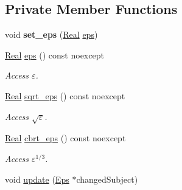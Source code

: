 \subsection*{Private Member Functions}
\begin{DoxyCompactItemize}
\item 
\hypertarget{classSpacy_1_1Mixin_1_1Eps_a818ab6dfab5e4eea583e1302bcc621f8}{void {\bfseries set\-\_\-eps} (\hyperlink{classSpacy_1_1Real}{Real} \hyperlink{classSpacy_1_1Mixin_1_1Eps_a812b99b0abc1d78a34b4114907f23f52}{eps})}\label{classSpacy_1_1Mixin_1_1Eps_a818ab6dfab5e4eea583e1302bcc621f8}

\item 
\hypertarget{classSpacy_1_1Mixin_1_1Eps_a812b99b0abc1d78a34b4114907f23f52}{\hyperlink{classSpacy_1_1Real}{Real} \hyperlink{classSpacy_1_1Mixin_1_1Eps_a812b99b0abc1d78a34b4114907f23f52}{eps} () const noexcept}\label{classSpacy_1_1Mixin_1_1Eps_a812b99b0abc1d78a34b4114907f23f52}

\begin{DoxyCompactList}\small\item\em Access $\varepsilon$. \end{DoxyCompactList}\item 
\hypertarget{classSpacy_1_1Mixin_1_1Eps_a1c1b0ed7f14ed4967dc7da9295a136d4}{\hyperlink{classSpacy_1_1Real}{Real} \hyperlink{classSpacy_1_1Mixin_1_1Eps_a1c1b0ed7f14ed4967dc7da9295a136d4}{sqrt\-\_\-eps} () const noexcept}\label{classSpacy_1_1Mixin_1_1Eps_a1c1b0ed7f14ed4967dc7da9295a136d4}

\begin{DoxyCompactList}\small\item\em Access $\sqrt\varepsilon$. \end{DoxyCompactList}\item 
\hypertarget{classSpacy_1_1Mixin_1_1Eps_a91dbe45e297be2bc53f1a96107a58c64}{\hyperlink{classSpacy_1_1Real}{Real} \hyperlink{classSpacy_1_1Mixin_1_1Eps_a91dbe45e297be2bc53f1a96107a58c64}{cbrt\-\_\-eps} () const noexcept}\label{classSpacy_1_1Mixin_1_1Eps_a91dbe45e297be2bc53f1a96107a58c64}

\begin{DoxyCompactList}\small\item\em Access $\varepsilon^{1/3}$. \end{DoxyCompactList}\item 
\hypertarget{classSpacy_1_1Mixin_1_1Eps_a151216968daef3da5f5cdc0b957ce01b}{void \hyperlink{classSpacy_1_1Mixin_1_1Eps_a151216968daef3da5f5cdc0b957ce01b}{update} (\hyperlink{classSpacy_1_1Mixin_1_1Eps_af616ae8e55a645cefd4d2d4504d6705a}{Eps} $\ast$changed\-Subject)}\label{classSpacy_1_1Mixin_1_1Eps_a151216968daef3da5f5cdc0b957ce01b}


\end{DoxyCompactItemize}
